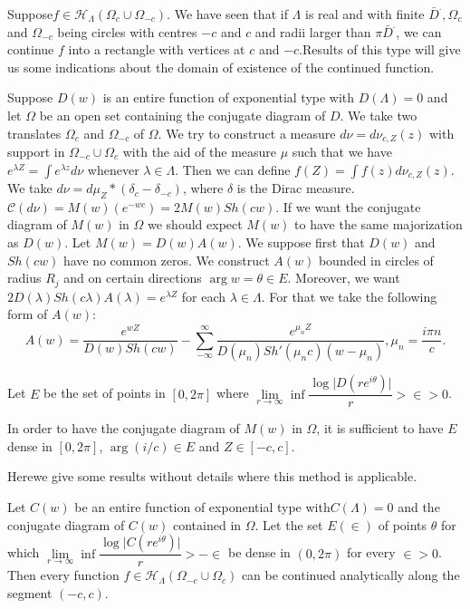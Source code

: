 Suppose\pageoriginale $f \in \mathscr{H}_\Lambda (\Omega_c \cup \Omega_{-c})$. We
have seen that if $\Lambda$ is real and with finite $\bar{D}^.,
\Omega_c$ and $\Omega_{-c}$ being circles with centres $-c$ and $c$
and radii larger than $\pi \bar{D}^.$, we can continue $f$ into a
rectangle with vertices at $c$ and $-c$.Results of this type will
give us some indications about the domain of existence of the
continued function. 

Suppose $D(w)$ is an entire function of exponential type with
$D(\Lambda) = 0$ and let $\Omega$ be an open set containing the
conjugate diagram of $D$. We take two translates $\Omega_c$ and
$\Omega_{-c}$ of $\Omega$. We try to construct a measure $d \nu= d
\nu_{c, Z}(z)$ with support in $\Omega_{-c} \cup \Omega_c$ with the
aid of the measure $\mu$ such that we have $e^{\lambda Z} = \int e^{\lambda z }
d \nu$ whenever $\lambda \in \Lambda$. Then we can define $f (Z) = \int f(z)
d\nu_{c,Z} (z)$. We take $d \nu = d \mu_Z * (\delta_c - \delta_{-c})$,
where $\delta$ is the Dirac measure. $\mathscr{C} (d \nu) = M(w)
(e^{-wc}) = 2 M(w) Sh (cw)$. If we want the conjugate diagram of $M(w)$
in $\Omega$ we should expect $M(w) $ to have the same majorization as
$D(w)$. Let $M(w) = D(w) A(w)$. We suppose first that $D(w)$ and
$Sh(cw)$ have no common zeros. We construct $A(w)$ bounded in circles
of radius $R_j$ and on certain directions $\arg w = \theta \in
E$. Moreover, we want $2D (\lambda) Sh(c \lambda) A ( \lambda) =
e^{\lambda Z} $ for each $\lambda \in \Lambda$. For that we take the
following form of $A(w)$: 
$$
A(w) =\frac{e^{wZ}}{D(w) Sh(cw)} - \sum^\infty_{- \infty}
\frac{e^{\mu_nZ}}{D (\mu_n) Sh' (\mu_n c) (w - \mu_n)}, \mu_n =
\frac{i \pi n}{c}. 
$$

\noindent
Let $E$ be the set of points in $[ 0, 2 \pi ]$ where $\lim\limits_{r
 \to \infty} \inf \dfrac{\log \big | D(re^{i \theta}) \big |}{r} >
\in > 0$. 

In order to have the conjugate diagram of $M(w)$ in $\Omega$, it is
sufficient to have $E$ dense in $[0, 2 \pi ]$, $\arg (i/c ) \in E$
and $Z \in [ - c, c]$. 

Here\pageoriginale we give some results without details where this
method is applicable. 

\begin{theorem*}
 Let $C(w)$ be an entire function of exponential type with\break $C
 (\Lambda) = 0$ and the conjugate diagram of $C(w)$ contained in
 $\Omega$. Let the set $E (\in )$ of points $\theta$ for which
 $\lim\limits_{r \to \infty} \inf \dfrac{\log \big | C(r e^{i
  \theta}) \big |}{r} > - \in $ be dense in $(0, 2 \pi)$
 for every $\in > 0$. Then every function $f \in
 \mathscr{H}_\Lambda (\Omega_{-c} \cup \Omega_c)$ can be continued
 analytically along the segment $(-c, c)$. 
\end{theorem*}

